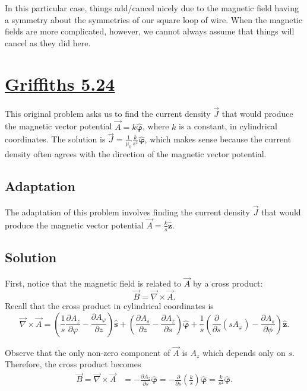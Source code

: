 \documentclass{article}
\newcommand{\zhat}{\hat{\textbf{z}}}
\newcommand{\vphihat}{\hat{\bm{\varphi}}}
\newcommand{\shat}{\hat{\textbf{s}}}
\newcommand{\del}{\vec{\nabla}}
\begin{document}
In this particular case, things add/cancel nicely due to the magnetic field having a symmetry about the symmetries of our square loop of wire. When the magnetic fields are more complicated, however, we cannot always assume that things will cancel as they did here.

\clearpage

\section*{\underline{Griffiths 5.24}}
This original problem asks us to find the current density $\vec{J}$ that would produce the magnetic vector potential $\vec{A} = k\vphihat$, where $k$ is a constant, in cylindrical coordinates. The solution is $\vec{J} = \frac{1}{\mu_0}\frac{k}{s^2}\vphihat$, which makes sense because the current density often agrees with the direction of the magnetic vector potential.

\subsection*{Adaptation}
The adaptation of this problem involves finding the current density $\vec{J}$ that would produce the magnetic vector potential $\vec{A} = \frac{k}{s}\zhat$.

\subsection*{Solution}
First, notice that the magnetic field is related to $\vec{A}$ by a cross product:
\begin{equation}
	\vec{B} = \del\times\vec{A}.
\end{equation}
Recall that the cross product in cylindrical coordinates is
\begin{equation}
	\del\times\vec{A} = \left( \frac{1}{s}\frac{\partial A_z}{\partial \varphi} - \frac{\partial A_\varphi}{\partial z} \right)\shat + \left( \frac{\partial A_s}{\partial z} - \frac{\partial A_z}{\partial s} \right)\vphihat + \frac{1}{s}\left( \frac{\partial}{\partial s}(s A_\varphi) - \frac{\partial A_s}{\partial \phi}  \right)\zhat.
\end{equation}

Observe that the only non-zero component of $\vec{A}$ is $A_z$ which depends only on $s$. Therefore, the cross product becomes
\begin{align}
	\vec{B} = \del\times\vec{A} &= -\frac{\partial A_z}{\partial s}\vphihat = -\frac{\partial}{\partial s}\left(\frac{k}{s}\right)\vphihat = \frac{k}{s^2}\vphihat.
\end{align}
\end{document}
